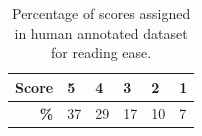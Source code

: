 \begin{table}[h!]
\centering \footnotesize
\begin{tabular}{r|l|l|l|l|l}
\textbf{Score} & 5 & 4 & 3 & 2 & 1 \\ \hline
\textbf{\%}    & 37 & 29 & 17 & 10 & 7
\end{tabular}
\caption{Percentage of scores assigned in human annotated dataset for reading ease.}\label{tab:human_annotation_distribution}
\end{table}